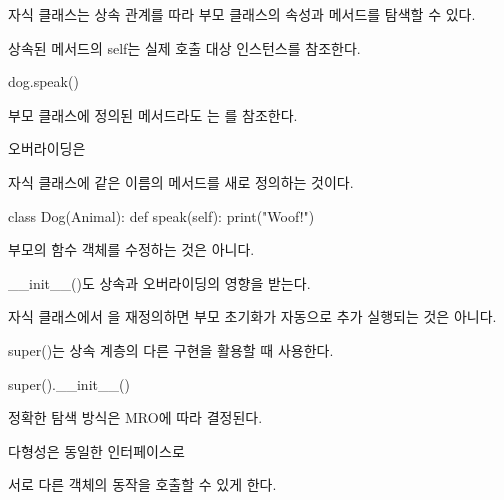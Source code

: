 자식 클래스는 상속 관계를 따라 부모 클래스의 속성과 메서드를 탐색할 수 있다.

\begin{dhknote}
\begin{dhksmry}[centered]
상속된 메서드의 self는 실제 호출 대상 인스턴스를 참조한다.
\end{dhksmry}
\end{dhknote}

\begin{dhkcode}
dog.speak()
\end{dhkcode}

부모 클래스에 정의된 메서드라도 는 를 참조한다.

\begin{dhknote}
\begin{dhksmry}[centered]
오버라이딩은 

자식 클래스에 같은 이름의 메서드를 새로 정의하는 것이다.
\end{dhksmry}
\end{dhknote}

\begin{dhkcode}
class Dog(Animal):
    def speak(self):
        print("Woof!")
\end{dhkcode}

부모의 함수 객체를 수정하는 것은 아니다.

\begin{dhknote}
\begin{dhksmry}[centered]
__init__()도 상속과 오버라이딩의 영향을 받는다.
\end{dhksmry}
\end{dhknote}

자식 클래스에서 을 재정의하면 부모 초기화가 자동으로 추가 실행되는 것은 아니다.

\begin{dhknote}
\begin{dhksmry}[centered]
super()는 상속 계층의 다른 구현을 활용할 때 사용한다.
\end{dhksmry}
\end{dhknote}

\begin{dhkcode}
super().__init__()
\end{dhkcode}

정확한 탐색 방식은 MRO에 따라 결정된다.

\begin{dhknote}
\begin{dhksmry}[centered]
다형성은 동일한 인터페이스로 

서로 다른 객체의 동작을 호출할 수 있게 한다.
\end{dhksmry}
\end{dhknote}

